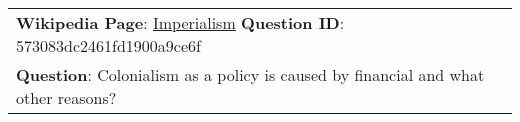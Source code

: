 \begin{figure*}[ht]
{\begin{tabular}{p{}}
            \textbf{Wikipedia Page}: \underline{Imperialism} \textbf{Question ID}: 573083dc2461fd1900a9ce6f                                                                                                                                                                                                                                                                                                                                                                                                                                                                                                                                                                                                                                                                                                                                                                                                                                                                                                                                                                                                                                                                                                                                                                                                                                      \\
            \textbf{Question}: Colonialism as a policy is caused by financial and what other reasons?                                                                                                                                                                                                                                                                                                                                                                                                                                                                                                                                                                                                                                                                                                                                                                                                                                                                                                                                                                                                                                                                                                                                                                                                                                            \\

\end{tabular}}
\end{figure*}
